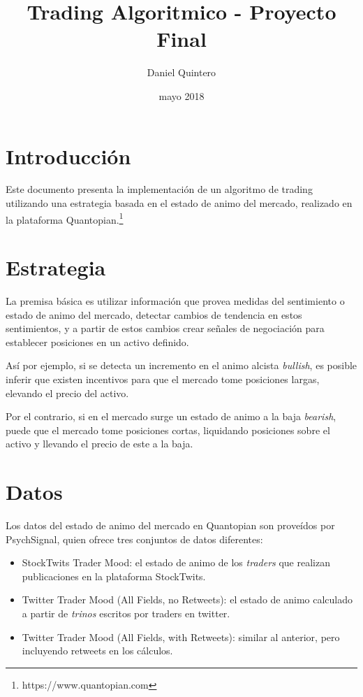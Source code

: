 \documentclass[a4paper, 11pt, twocolumn]{article}
\title{Trading Algoritmico - Proyecto Final}
\author{Daniel Quintero}
\date{mayo 2018}
\begin{document}
\maketitle

\section{Introducción}
Este documento presenta la implementación de un algoritmo de trading utilizando una estrategia basada en el estado de animo del mercado, realizado en la plataforma Quantopian.\footnote{https://www.quantopian.com}

\section{Estrategia}
La premisa básica es utilizar información que provea medidas del sentimiento o estado de animo del mercado, detectar cambios de tendencia en estos sentimientos, y a partir de estos cambios crear señales de negociación para establecer posiciones en un activo definido.

Así por ejemplo, si se detecta un incremento en el animo alcista \textit{bullish}, es posible inferir que existen incentivos para que el mercado tome posiciones largas, elevando el precio del activo.

Por el contrario, si en el mercado surge un estado de animo a la baja \textit{bearish}, puede que el mercado tome posiciones cortas, liquidando posiciones sobre el activo y llevando el precio de este a la baja.

\section{Datos}
Los datos del estado de animo del mercado en Quantopian son proveídos por PsychSignal, quien ofrece tres conjuntos de datos diferentes:

\begin{itemize}
    \item StockTwits Trader Mood: el estado de animo de los \textit{traders} que realizan publicaciones en la plataforma StockTwits.
    \item Twitter Trader Mood (All Fields, no Retweets): el estado de animo calculado a partir de \textit{trinos} escritos por traders en twitter.
    \item Twitter Trader Mood (All Fields, with Retweets): similar al anterior, pero incluyendo retweets en los cálculos.
\end{itemize}
\end{document}
